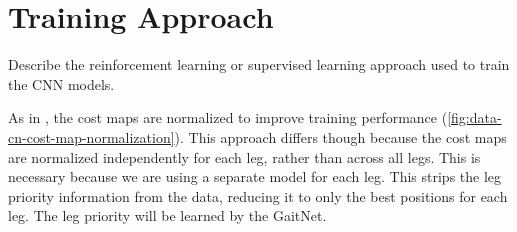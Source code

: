 \section{Training Approach}

\begin{outline}
  Describe the reinforcement learning or supervised learning approach
  used to train the CNN models.
\end{outline}

As in \cite{bratta_contactnet_2024}, the cost maps are normalized to
improve training performance
(\autoref{fig:data-cn-cost-map-normalization}). This approach differs
though because the cost maps are normalized independently for each
leg, rather than across all legs. This is necessary because we are
using a separate model for each leg. This strips the leg priority
information from the data, reducing it to only the best positions for
each leg. The leg priority will be learned by the GaitNet.


